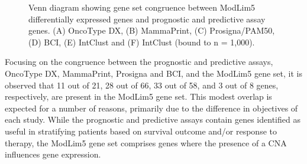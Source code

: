 \begin{figure}[H]
\caption[Venn diagram showing gene set congruence between ModLim5 differentially expressed genes and prognostic and predictive assay genes.]{Venn diagram showing gene set congruence between ModLim5 differentially expressed genes and prognostic and predictive assay genes. (A) OncoType DX, (B) MammaPrint, (C) Prosigna/PAM50, (D) BCI, (E) IntClust and (F) IntClust (bound to n = 1,000).}\label{lab}

\label{fig:lo}
\end{figure}

\newpage
Focusing on the congruence between the prognostic and predictive assays, OncoType DX, MammaPrint, Prosigna and BCI, and the ModLim5 gene set, it is observed that 11 out of 21, 28 out of 66, 33 out of 58, and 3 out of 8 genes, respectively, are present in the ModLim5 gene set. This modest overlap is expected for a number of reasons, primarily due to the difference in objectives of each study. While the prognostic and predictive assays contain genes identified as useful in stratifying patients based on survival outcome and/or response to therapy, the ModLim5 gene set comprises genes where the presence of a CNA influences gene expression. 

